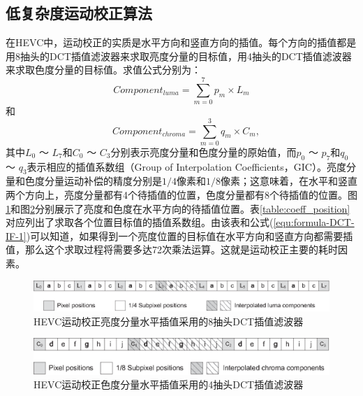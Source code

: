 \subsection{低复杂度运动校正算法}

在HEVC中，运动校正的实质是水平方向和竖直方向的插值。每个方向的插值都是用8抽头的DCT插值滤波器来求取亮度分量的目标值，用4抽头的DCT插值滤波器来求取色度分量的目标值。求值公式分别为：
\begin{equation}
\label{equ:formula-DCT-IF-1}
Component_{luma} = \sum_{m=0}^7 p_m \times L_m
\end{equation}
和
\begin{equation}
\label{equ:formula-DCT-IF-2}
\quad Component_{chroma} = \sum_{m=0}^3 q_m \times C_m,
\end{equation}
其中$L_0$ ～ $L_7$和$C_0$ ～ $C_3$分别表示亮度分量和色度分量的原始值，而$p_0$ ～ $p_7$和$q_0$ ～ $q_3$表示相应的插值系数组（Group of Interpolation Coefficients，GIC）。亮度分量和色度分量运动补偿的精度分别是$1/4$像素和$1/8$像素；这意味着，在水平和竖直两个方向上，亮度分量都有4个待插值的位置，色度分量都有8个待插值的位置。图\ref{fig:luma_position}和图\ref{fig:chroma_position}分别展示了亮度和色度在水平方向的待插值位置。表\ref{table:coeff_position}对应列出了求取各个位置目标值的插值系数组。由该表和公式(\ref{equ:formula-DCT-IF-1})可以知道，如果得到一个亮度位置的目标值在水平方向和竖直方向都需要插值，那么这个求取过程将需要多达72次乘法运算。这就是运动校正主要的耗时因素。

\begin{figure}[!tp]
	\centering
	\includegraphics[width = 0.95\linewidth]{eps/luma_position}
	\caption{\label{fig:luma_position}
		HEVC运动校正亮度分量水平插值采用的8抽头DCT插值滤波器}
\end{figure}

\begin{figure}[!tp]
	\centering
	\includegraphics[width = 0.95\linewidth]{eps/chroma_position}
	\caption{\label{fig:chroma_position}
		HEVC运动校正色度分量水平插值采用的4抽头DCT插值滤波器}
\end{figure}

